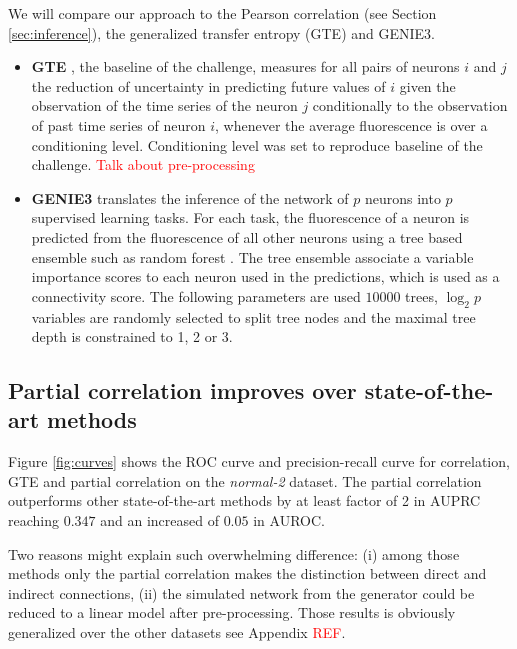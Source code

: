 \documentclass[wcp]{jmlr}
\begin{document}
We will compare our approach to the Pearson correlation (see Section
\ref{sec:inference}), the generalized transfer entropy (GTE) and GENIE3.
\begin{itemize}
\item \textbf{GTE} \citep{stetter2012model}
, the baseline of the challenge, measures for all pairs of
neurons $i$ and $j$ the reduction of uncertainty in predicting future values of
$i$ given the observation of the time series of the neuron $j$
conditionally to the observation of past time series of neuron $i$,
whenever the average fluorescence is over a conditioning level.
Conditioning level was set to reproduce baseline of the challenge.
\textcolor{red}{Talk about pre-processing}

\item \textbf{GENIE3} \citep{huynhthu2010inferring} translates the inference of the
network of $p$ neurons into $p$ supervised learning tasks. For each task,
the fluorescence of a neuron is predicted from the fluorescence
of all other neurons using a tree based ensemble such as
random forest \citep{breiman2001random}. The tree ensemble associate a
variable importance scores \citep{louppe2013understanding}
to each neuron used in the predictions, which is used as a connectivity
score. The following parameters are used
$10000$ trees, $\log_2{p}$ variables are randomly selected to split tree
nodes and the maximal tree depth is constrained to 1, 2 or 3.
\end{itemize}


\subsection*{Partial correlation improves over state-of-the-art methods}

Figure \ref{fig:curves} shows the ROC curve and precision-recall curve
for correlation, GTE and partial correlation on the \textit{normal-2}
dataset. The partial correlation outperforms other state-of-the-art methods
by at least factor of 2 in AUPRC reaching $0.347$ and an increased of $0.05$ in
AUROC.

Two reasons might explain such overwhelming difference: (i) among
those methods only the partial correlation makes the distinction between
direct and indirect connections, (ii) the simulated network from the
\citep{stetter2012model} generator could be reduced to a linear model after
pre-processing. Those results is obviously generalized over the other
datasets see Appendix \textcolor{red}{REF}.
\end{document}

